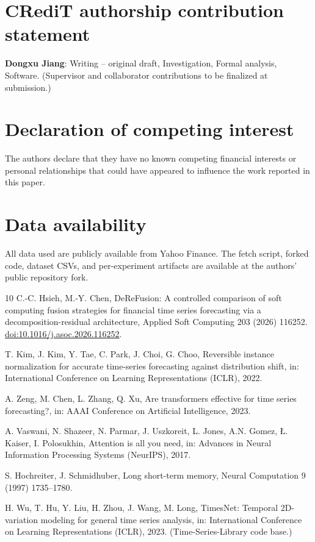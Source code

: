 \documentclass[preprint,12pt]{elsarticle}
\begin{document}
\section*{CRediT authorship contribution statement}
\textbf{Dongxu Jiang}: Writing -- original draft, Investigation, Formal
analysis, Software. (Supervisor and collaborator contributions to be
finalized at submission.)

\section*{Declaration of competing interest}
The authors declare that they have no known competing financial interests
or personal relationships that could have appeared to influence the work
reported in this paper.

\section*{Data availability}
All data used are publicly available from Yahoo Finance. The fetch script,
forked code, dataset CSVs, and per-experiment artifacts are available at
the authors' public repository fork.


\begin{thebibliography}{10}
C.-C. Hsieh, M.-Y. Chen,
DeReFusion: A controlled comparison of soft computing fusion strategies for
financial time series forecasting via a decomposition-residual architecture,
Applied Soft Computing 203 (2026) 116252.
\href{https://doi.org/10.1016/j.asoc.2026.116252}{doi:10.1016/j.asoc.2026.116252}.

T. Kim, J. Kim, Y. Tae, C. Park, J. Choi, G. Choo,
Reversible instance normalization for accurate time-series forecasting
against distribution shift,
in: International Conference on Learning Representations (ICLR), 2022.

A. Zeng, M. Chen, L. Zhang, Q. Xu,
Are transformers effective for time series forecasting?,
in: AAAI Conference on Artificial Intelligence, 2023.

A. Vaswani, N. Shazeer, N. Parmar, J. Uszkoreit, L. Jones, A.N. Gomez,
{\L}. Kaiser, I. Polosukhin,
Attention is all you need,
in: Advances in Neural Information Processing Systems (NeurIPS), 2017.

S. Hochreiter, J. Schmidhuber,
Long short-term memory,
Neural Computation 9 (1997) 1735--1780.

H. Wu, T. Hu, Y. Liu, H. Zhou, J. Wang, M. Long,
TimesNet: Temporal 2D-variation modeling for general time series analysis,
in: International Conference on Learning Representations (ICLR), 2023.
(Time-Series-Library code base.)

\end{thebibliography}
\end{document}
